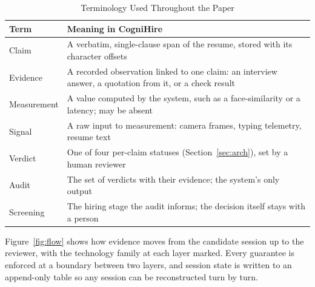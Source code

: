 \documentclass[conference,a4paper]{IEEEtran}
\begin{document}
\begin{table}[t]
\caption{Terminology Used Throughout the Paper}
\label{tab:terms}
\centering
\footnotesize
\begin{tabular}{@{}L{0.21\columnwidth}L{0.71\columnwidth}@{}}
\toprule
Term & Meaning in CogniHire \\
\midrule
Claim & A verbatim, single-clause span of the resume, stored with its character offsets \\
Evidence & A recorded observation linked to one claim: an interview answer, a quotation from it, or a check result \\
Measurement & A value computed by the system, such as a face-similarity or a latency; may be absent \\
Signal & A raw input to measurement: camera frames, typing telemetry, resume text \\
Verdict & One of four per-claim statuses (Section~\ref{sec:arch}), set by a human reviewer \\
Audit & The set of verdicts with their evidence; the system's only output \\
Screening & The hiring stage the audit informs; the decision itself stays with a person \\
\bottomrule
\end{tabular}
\end{table}

Figure~\ref{fig:flow} shows how evidence moves from the candidate session up
to the reviewer, with the technology family at each layer marked. Every
guarantee is enforced at a boundary between two layers, and session state is
written to an append-only table so any session can be reconstructed turn by
turn.
\end{document}
